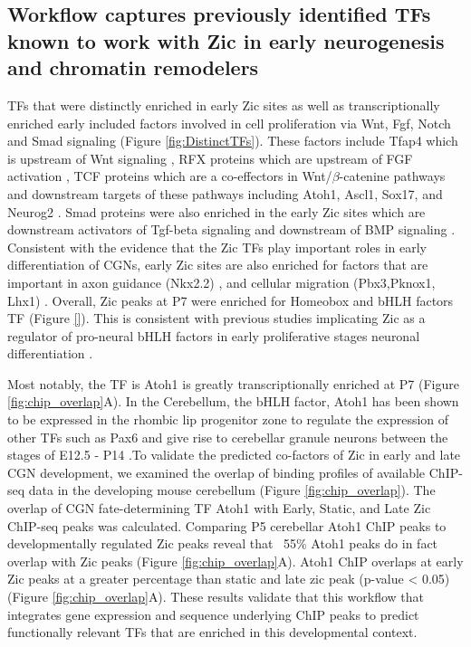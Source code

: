 \documentclass[fleqn,10pt]{wlscirep}
\begin{document}
\subsection*{Workflow captures previously identified TFs known to work with Zic in early neurogenesis and chromatin remodelers}
TFs that were distinctly enriched in early Zic sites as well as transcriptionally enriched early included factors involved in cell proliferation via Wnt, Fgf, Notch and Smad signaling (Figure \ref{fig:DistinctTFs}). These factors include Tfap4 which is upstream  of Wnt signaling \cite{Medina-Martinez2020TheDevelopment, Song2018TranscriptionCarcinoma}, RFX proteins which are upstream of FGF activation \cite{Hsu2012CiliogenicPromoter}, TCF proteins \cite{Shy2013RegulationSignaling} which are a co-effectors in  Wnt/$\beta$-catenine pathways and downstream targets of these pathways including  Atoh1, Ascl1, Sox17, and Neurog2 \cite{Dennis2019BHLHReprogramming, Zhu2019pBCL11ACancer/p, Lacomme2012NEUROG2Cycle, Katoh2018MultilayeredReview, Lebensohn2016ComparativeSignaling}. Smad proteins were also enriched in the early Zic sites which are downstream activators of Tgf-beta signaling and downstream of BMP signaling \cite{Liu2021SMAD4Pathways, Nickel2019SpecificationSignaling, Derynck2003Smad-dependentsignaling}. Consistent with the evidence that the Zic TFs play important roles in early differentiation of CGNs,
early Zic sites are also enriched for factors that are important in axon guidance (Nkx2.2) \cite{}, and cellular migration (Pbx3,Pknox1, Lhx1) \cite{}. Overall, Zic peaks at P7 were enriched for Homeobox and bHLH factors TF (Figure \ref{}). This is consistent with previous studies implicating Zic as a regulator of pro-neural bHLH factors in early proliferative stages neuronal differentiation \cite{Aruga2018ZicDisease}.

Most notably, the TF is Atoh1 is greatly transcriptionally enriched at P7 (Figure \ref{fig:chip_overlap}A). In the Cerebellum, the bHLH factor, Atoh1 has been shown to be expressed in the rhombic lip progenitor zone to regulate the expression of other TFs such as Pax6 and give rise to cerebellar granule neurons between the stages of E12.5 - P14 \cite{Aruga2018ZicDisease, Yeung2014WlsDevelopment, Wang2005Math1Cerebellum, Ben-Arie1997Math1Neurons}.To validate the predicted co-factors of Zic in early and late CGN development, we examined the overlap of binding profiles of available ChIP-seq data in the developing mouse cerebellum  (Figure \ref{fig:chip_overlap}). The overlap of CGN fate-determining TF Atoh1 with Early, Static, and Late Zic ChIP-seq peaks was calculated. Comparing P5 cerebellar Atoh1 ChIP peaks to developmentally regulated Zic peaks reveal that ~55\%  Atoh1  peaks do in fact overlap with Zic peaks (Figure \ref{fig:chip_overlap}A). Atoh1 ChIP overlaps at early Zic peaks at a greater percentage than static and late zic peak (p-value < 0.05) (Figure \ref{fig:chip_overlap}A). These results validate that this workflow that integrates gene expression and sequence underlying ChIP peaks to predict functionally relevant TFs that are enriched in this developmental context.
\end{document}

